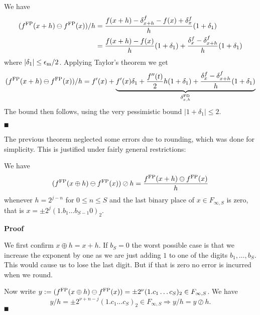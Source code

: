 We have
\begin{align*}
(f^{\rm FP}(x + h) \ensuremath{\ominus} f^{\rm FP}(x)) / h &= {f(x + h) -  \ensuremath{\delta}^f_{x+h} - f(x) + \ensuremath{\delta}^f_x \over h} (1 + \ensuremath{\delta}_1) \\
&= {f(x+h) - f(x) \over h} (1 + \ensuremath{\delta}_1) + { \ensuremath{\delta}^f_x - \ensuremath{\delta}^f_{x+h} \over h} (1 + \ensuremath{\delta}_1)
\end{align*}
where $|\ensuremath{\delta}_1| \ensuremath{\leq} {\ensuremath{\epsilon}_{\rm m} / 2}$. Applying Taylor's theorem we get
\[
(f^{\rm FP}(x + h) \ensuremath{\ominus} f^{\rm FP}(x)) / h = f'(x) + \underbrace{f'(x) \ensuremath{\delta}_1 + {f''(t) \over 2} h (1 + \delta_1) + {\ensuremath{\delta}^f_x  - \ensuremath{\delta}^f_{x+h}\over h} (1 + \ensuremath{\delta}_1)}_{\ensuremath{\delta}_{x,h}^{\rm FD}}
\]
The bound then follows, using the very pessimistic bound $|1 + \ensuremath{\delta}_1| \ensuremath{\leq} 2$.

\ensuremath{\QED}

The previous theorem neglected some errors due to rounding, which was done for simplicity. This is justified under fairly general restrictions:

\begin{corollary} We have
\[
(f^{\rm FP}(x \ensuremath{\oplus} h) \ensuremath{\ominus} f^{\rm FP}(x)) \ensuremath{\oslash} h = {f^{\rm FP}(x + h) \ensuremath{\ominus} f^{\rm FP}(x) \over h}
\]
whenever  $h = 2^{j-n}$ for $0 \ensuremath{\leq} n \ensuremath{\leq} S$ and the last binary place of $x \ensuremath{\in} F_{\ensuremath{\infty},S}$ is zero, that is $x = \ensuremath{\pm}2^j (1.b_1\ensuremath{\ldots}b_{S-1}0)_2$.

\end{corollary}
\textbf{Proof}

We first confirm $x \ensuremath{\oplus} h = x + h$. If $b_S = 0$ the worst possible case is that we increase the exponent by one as we are just adding $1$ to one of the digits $b_1,\ensuremath{\ldots},b_S$. This would cause us to lose the last digit. But if that is zero no error is incurred when we round.

Now write $y := (f^{\rm FP}(x \ensuremath{\oplus} h) \ensuremath{\ominus} f^{\rm FP}(x)) = \ensuremath{\pm}2^\ensuremath{\nu} (1.c_1\ensuremath{\ldots}c_S)_2 \ensuremath{\in} F_{\ensuremath{\infty},S}$. We have
\[
y/h = \ensuremath{\pm}2^{\ensuremath{\nu}+n-j} (1.c_1\ensuremath{\ldots}c_S)_2 \ensuremath{\in} F_{\ensuremath{\infty},S} \ensuremath{\Rightarrow} y/h = y \ensuremath{\oslash} h.
\]
\ensuremath{\QED}

